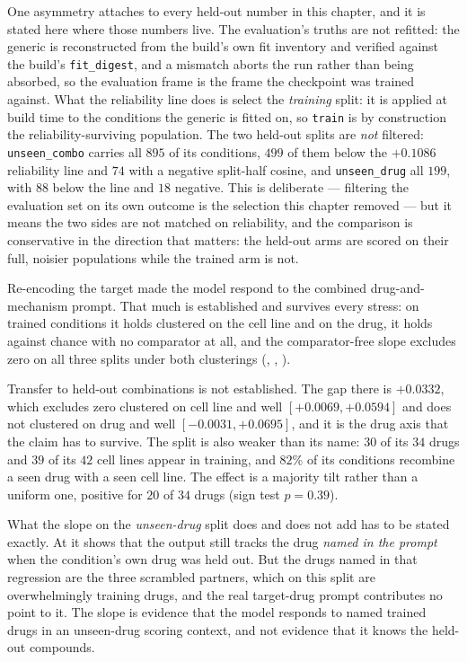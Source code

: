 One asymmetry attaches to every held-out number in this chapter, and it is stated here where those
numbers live. The evaluation's truths are not refitted: the generic is reconstructed from the
build's own fit inventory and verified against the build's \texttt{fit\_digest}, and a mismatch
aborts the run rather than being absorbed, so the evaluation frame is the frame the checkpoint was
trained against. What the reliability line does is select the \emph{training} split: it is applied
at build time to the conditions the generic is fitted on, so \texttt{train} is by construction the
reliability-surviving population. The two held-out splits are \emph{not} filtered: \texttt{unseen\_combo}
carries all $895$ of its conditions, $499$ of them below the $+0.1086$ reliability line and $74$ with
a negative split-half cosine, and \texttt{unseen\_drug} all $199$, with $88$ below the line and $18$
negative. This is deliberate --- filtering the evaluation set on its own outcome is the selection
this chapter removed --- but it means the two sides are not matched on reliability, and the
comparison is conservative in the direction that matters: the held-out arms are scored on their full,
noisier populations while the trained arm is not.

\begin{claim}
Re-encoding the target made the model respond to the combined drug-and-mechanism prompt. That
much is established and survives every stress: on trained conditions it holds clustered on the cell
line and on the drug, it holds against chance with no comparator at all, and the comparator-free
slope excludes zero on all three splits under both clusterings
(, , ).

Transfer to held-out combinations is not established. The gap there is $+0.0332$, which excludes
zero clustered on cell line and well \nolinebreak[3]$[+0.0069, +0.0594]$ and does not clustered on
drug and well \nolinebreak[3]$[-0.0031, +0.0695]$, and it is the drug axis that the claim has to
survive. The split is also weaker than its
name: $30$ of its $34$ drugs and $39$ of its $42$ cell lines appear in training, and $82\%$ of its
conditions recombine a seen drug with a seen cell line. The effect is a majority tilt rather than a
uniform one, positive for $20$ of $34$ drugs (sign test $p = 0.39$).

What the slope on the \emph{unseen-drug} split does and does not add has to be stated exactly. At
 it shows that the output still tracks the drug \emph{named in the
prompt} when the condition's own drug was held out. But the drugs named in that regression are the
three scrambled partners, which on this split are overwhelmingly training drugs, and the real
target-drug prompt contributes no point to it. The slope is evidence that the model responds to
named trained drugs in an unseen-drug scoring context, and not evidence that it knows the held-out
compounds.
\end{claim}

